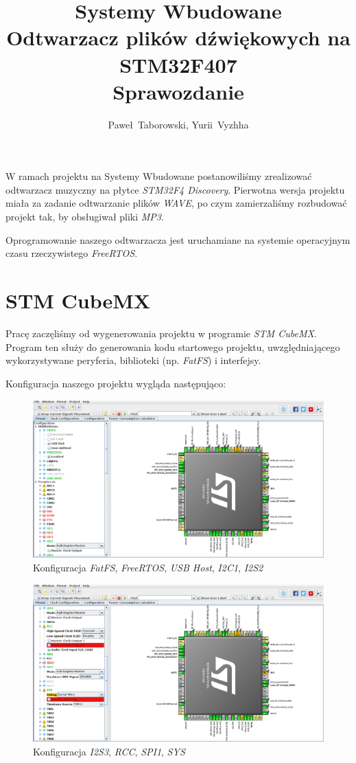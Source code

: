\documentclass[12pt,a4paper]{article}
\author{Paweł~Taborowski, Yurii~Vyzhha}
\title{Systemy Wbudowane \\Odtwarzacz plików dźwiękowych na STM32F407\\Sprawozdanie}
\begin{document}
  \maketitle
W ramach projektu na Systemy Wbudowane postanowiliśmy zrealizować odtwarzacz muzyczny na płytce  \emph{STM32F4 Discovery}. Pierwotna wersja projektu miała za zadanie odtwarzanie plików \emph{WAVE}, po czym zamierzaliśmy rozbudować projekt tak, by obsługiwał pliki \emph{MP3}.

Oprogramowanie naszego odtwarzacza jest uruchamiane na systemie operacyjnym czasu rzeczywistego \textit{FreeRTOS}.

\section{STM CubeMX}
Pracę zaczęliśmy od wygenerowania projektu w programie \emph{STM CubeMX}. Program ten służy do generowania kodu startowego projektu, uwzględniającego wykorzystywane peryferia, biblioteki (np. \textit{FatFS}) i interfejsy.

Konfiguracja naszego projektu wygląda następująco:

\begin{figure}[H]
 \centerline{\includegraphics[width=\textwidth]{img/img1}}
 \caption{Konfiguracja \emph{FatFS}, \emph{FreeRTOS}, \emph{USB Host}, \emph{I2C1}, \emph{I2S2}}
 \label{img1}
\end{figure}

\begin{figure}[H]
 \centerline{\includegraphics[width=\textwidth]{img/img2}}
 \caption{Konfiguracja \emph{I2S3}, \emph{RCC}, \emph{SPI1}, \emph{SYS}}
 \label{img2}
\end{figure}
\end{document}
